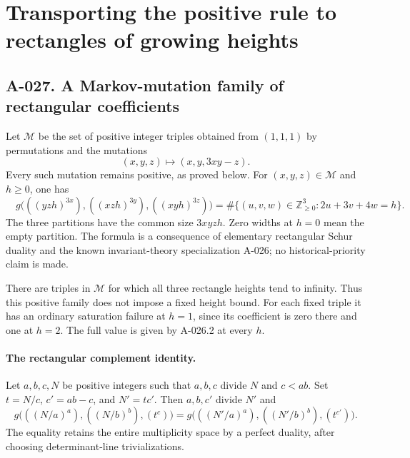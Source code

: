 \section{Transporting the positive rule to rectangles of growing heights}

\subsection*{A-027. A Markov-mutation family of rectangular coefficients}
Let $\mathcal M$ be the set of positive integer triples
obtained from $(1,1,1)$ by permutations and the mutations
\[
                         (x,y,z)\longmapsto(x,y,3xy-z).
\]
Every such mutation remains positive, as proved below.
For $(x,y,z)\in\mathcal M$ and $h\geq0$, one has
\[
 \boxed{\quad
 g\bigl(((yzh)^{3x}),((xzh)^{3y}),((xyh)^{3z})\bigr)
   =\#\{(u,v,w)\in\mathbb Z_{\geq0}^3:2u+3v+4w=h\}.
 \quad}                                                   \tag{A-027.1}
\]
The three partitions have the common size $3xyz h$.
Zero widths at $h=0$ mean the empty partition. The formula
is a consequence of elementary rectangular Schur duality
and the known invariant-theory specialization A-026; no
historical-priority claim is made.

There are triples in $\mathcal M$ for which all three
rectangle heights tend to infinity. Thus this positive
family does not impose a fixed height bound. For each
fixed triple it has an ordinary saturation failure at
$h=1$, since its coefficient is zero there and one at
$h=2$. The full value is given by A-026.2 at every $h$.

\paragraph{The rectangular complement identity.}
Let $a,b,c,N$ be positive integers such that $a,b,c$ divide
$N$ and $c<ab$. Set $t=N/c$, $c'=ab-c$, and $N'=tc'$.
Then $a,b,c'$ divide $N'$ and
\[
 g\bigl(((N/a)^a),((N/b)^b),(t^c)\bigr)
  =g\bigl(((N'/a)^a),((N'/b)^b),(t^{c'})\bigr).             \tag{A-027.2}
\]
The equality retains the entire multiplicity space by a
perfect duality, after choosing determinant-line trivializations.

